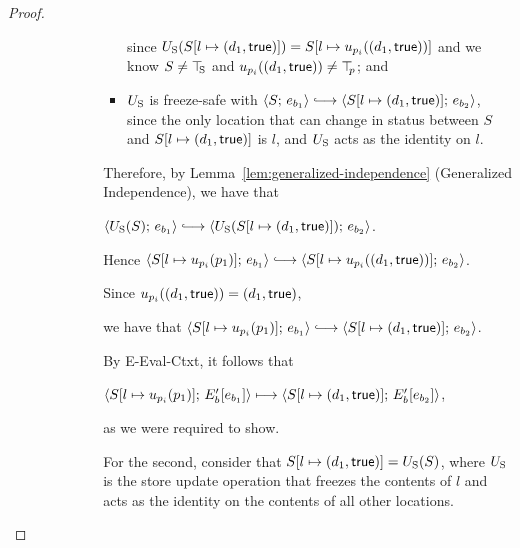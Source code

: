 \begin{proof}
\begin{enumerate}
\begin{enumerate}
\begin{itemize}
\begin{itemize}
\begin{itemize}
            since $U_{\mathrm{S}}(S[l \mapsto (d_1, \textsf{true})]) =
            S[l \mapsto u_{p_i}((d_1, \textsf{true}))]$ and
            we know $S \neq \top\hspace{-0.85mm}_{\mathrm{S}}$ and
            $u_{p_i}((d_1, \textsf{true})) \neq \top\hspace{-0.85mm}_{p}$; and
          \item $U_{\mathrm{S}}$ is freeze-safe with $\config{S}{e_{b_1}}
            \parstepsto
            \config{\extS{S}{l}{d_1}{\frozentrue}}{e_{b_2}}$, since
            the only location that can change in status between $S$
            and $S[l \mapsto (d_1, \textsf{true})]$ is $l$, and $U_{\mathrm{S}}$
            acts as the identity on $l$.
          \end{itemize}
          Therefore, by Lemma~\ref{lem:generalized-independence}
          (Generalized Independence), we have that

          $\config{\Ustore(S)}{e_{b_1}} \parstepsto
          \config{\Ustore(\extS{S}{l}{d_1}{\frozentrue})}{e_{b_2}}$.

          Hence $\config{\extSRaw{S}{l}{u_{p_i}(p_1)}}{e_{b_1}}
          \parstepsto
          \config{\extSRaw{S}{l}{u_{p_i}(\state{d_1}{\frozentrue})}}{e_{b_2}}$.

          Since $u_{p_i}((d_1, \textsf{true})) =
          (d_1, \textsf{true})$,

          we have that
          $\config{\extSRaw{S}{l}{u_{p_i}(p_1)}}{e_{b_1}}
          \parstepsto
          \config{\extS{S}{l}{d_1}{\frozentrue}}{e_{b_2}}$.

          By {\sc E-Eval-Ctxt}, it follows that

          $\langle S[l \mapsto u_{p_i}(p_1)];\, E'_b\hspace{-0.5mm}\left[e_{b_1}\right] \rangle
          \longmapsto
          \langle S[l \mapsto (d_1, \textsf{true})];\, E'_b\hspace{-0.5mm}\left[e_{b_2}\right] \rangle$,

          as we were required to show.

          For the second, consider that
          $S[l \mapsto (d_1, \textsf{true})] = U_{\mathrm{S}}(S)$, where $U_{\mathrm{S}}$ is
          the store update operation that freezes the contents of $l$
          and acts as the identity on the contents of all other
          locations.


\end{itemize}
\end{itemize}
\end{enumerate}
\end{enumerate}
\end{proof}
